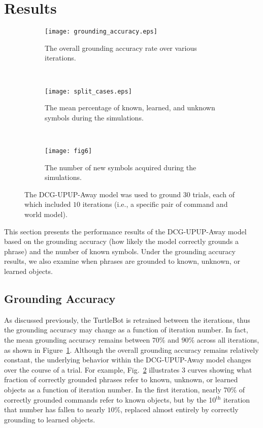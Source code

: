 \section{Results}
\begin{figure*}[htb!]
\centering
\begin{subfigure}[b]{0.32\textwidth}
\centering
\texttt{[image: grounding\_accuracy.eps]}
\caption{The overall grounding accuracy rate over various iterations.}
\label{fig:g_acc}
\end{subfigure}
~
\begin{subfigure}[b]{0.33\textwidth}
\centering
\texttt{[image: split\_cases.eps]}
\caption{The mean percentage of known, learned, and unknown symbols during the simulations.}
\label{fig:g_acc_split}
\end{subfigure}
~
\begin{subfigure}[b]{0.31\textwidth}
\centering
\texttt{[image: fig6]}
\caption{The number of new symbols acquired during the simulations.}
\label{fig:symbols}
\end{subfigure}
\caption{The DCG-UPUP-Away model was used to ground $30$ trials, each of which included $10$ iterations (i.e., a specific pair of command and world model).}
\end{figure*}


This section presents the performance results of the DCG-UPUP-Away model based on the grounding accuracy (how likely the model correctly grounds a phrase) and the number of known symbols.
Under the grounding accuracy results, we also examine when phrases are grounded to known, unknown, or learned objects.
\subsection{Grounding Accuracy}
As discussed previously, the TurtleBot is retrained between the iterations, thus the grounding accuracy may change as a function of iteration number. In fact, the mean grounding accuracy remains between $70\%$ and $90\%$ across all iterations, as shown in Figure~\ref{fig:g_acc}. Although the overall grounding accuracy remains relatively constant, the underlying behavior within the DCG-UPUP-Away model changes over the course of a trial. For example, Fig.~\ref{fig:g_acc_split} illustrates 3 curves showing what fraction of correctly grounded phrases refer to known, unknown, or learned objects as a function of iteration number. In the first iteration, nearly $70\%$ of correctly grounded commands refer to known objects, but by the 10$^\text{th}$ iteration that number has fallen to nearly $10\%$, replaced almost entirely by correctly grounding to learned objects.

